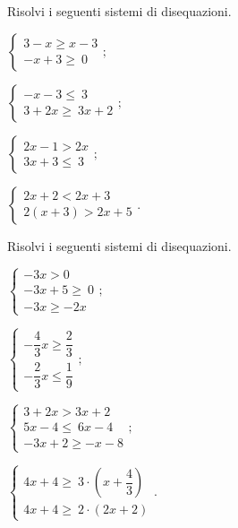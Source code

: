 \begin{esercizio}[\Ast]
 \label{ese:18.39}
 Risolvi i seguenti sistemi di disequazioni.
 \begin{multicols}{2}
 \begin{enumeratea}
 \item $\left\{\begin{array}{l}
	3-x\ge x-3\\
	-x+3\ge~0
	\end{array}\right.;$
\item $\left\{\begin{array}{l}
	-x-3\le~3\\
	3+2x\ge~3x+2
   \end{array}\right.;$
\item $\left\{\begin{array}{l}
	2x-1>2x \\
	3x+3\le~3
	\end{array}\right.;$
\item $\left\{\begin{array}{l}
	2x+2<2x+3\\
	2(x+3)>2x+5
	\end{array}\right..$
\end{enumeratea}
\end{multicols}
\end{esercizio}

\begin{esercizio}[\Ast]
 \label{ese:18.40}
 Risolvi i seguenti sistemi di disequazioni.
 \begin{multicols}{2}
 \begin{enumeratea}
 \item $\left\{\begin{array}{l}
	-3x>0\\
	-3x+5\ge~0\\
	-3x\ge-2x
	\end{array}\right.;$
\item {\longarray $\left\{\begin{array}{l}
	-{\dfrac{4}{3}}x\ge\dfrac{2}{3}\\
	-{\dfrac{2}{3}}x\le\dfrac{1}{9}
	\end{array}\right.;$}
\item $\left\{\begin{array}{l}
	3+2x>3x+2 \\
	5x-4\le~6x-4\\
	-3x+2\ge -x-8
	\end{array}\right.;$
\item $\left\{\begin{array}{l}
	4x+4\ge~3\cdot\left(x+\dfrac{4}{3}\right)\\
	4x+4\ge~2\cdot (2x+2)
	\end{array}\right..$
\end{enumeratea}
\end{multicols}
\end{esercizio}


